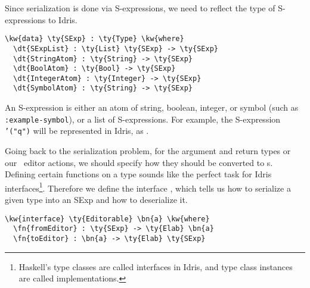 Since serialization is done via S-expressions, we need to reflect the type of
S-expressions to Idris.

\begin{Verbatim}[framesep=2mm, label=\footnotesize{\normalfont{Idris}}, labelposition=topline]
\kw{data} \ty{SExp} : \ty{Type} \kw{where}
  \dt{SExpList} : \ty{List} \ty{SExp} -> \ty{SExp}
  \dt{StringAtom} : \ty{String} -> \ty{SExp}
  \dt{BoolAtom} : \ty{Bool} -> \ty{SExp}
  \dt{IntegerAtom} : \ty{Integer} -> \ty{SExp}
  \dt{SymbolAtom} : \ty{String} -> \ty{SExp}
\end{Verbatim}

An S-expression is either an atom of string, boolean, integer, or symbol (such
as \texttt{:example-symbol}), or a list of S-expressions.
For example, the S-expression \texttt{'("q")} will be represented in Idris, as
.

Going back to the serialization problem, for the argument and return types or
our \Elab\ editor actions, we should specify how they should be converted to
s.  Defining certain functions on a type sounds like the perfect task
for Idris interfaces\footnote{Haskell's type classes are called interfaces in
Idris, and type class instances are called implementations.}.
Therefore we define the interface , which tells us
how to serialize a given type into an SExp and how to deserialize it.

\begin{Verbatim}[framesep=2mm, label=\footnotesize{\normalfont{Idris}}, labelposition=topline]
\kw{interface} \ty{Editorable} \bn{a} \kw{where}
  \fn{fromEditor} : \ty{SExp} -> \ty{Elab} \bn{a}
  \fn{toEditor} : \bn{a} -> \ty{Elab} \ty{SExp}
\end{Verbatim}

